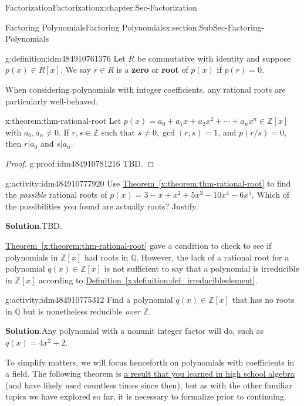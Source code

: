 \documentclass[oneside,10pt,]{book}
\newcommand{\blocktitlefont}{\relax}
\newcommand{\xreffont}{\relax}
\newcommand{\terminology}[1]{\textbf{#1}}
\numberwithin{equation}{section}
\def\Z{{\mathbb Z}}
\def\Q{{\mathbb Q}}
\begin{document}
\begin{chapterptx}{Factorization}{}{Factorization}{}{}{x:chapter:Sec-Factorization}
\begin{sectionptx}{Factoring Polynomials}{}{Factoring Polynomials}{}{}{x:section:SubSec-Factoring-Polynomials}
\begin{definition}{}{g:definition:idm484910761376}
Let \(R\) be commutative with identity and suppose \(p(x) \in R[x]\). We say \(r\in R\) is a \terminology{zero} or \terminology{root} of \(p(x)\) if \(p(r) = 0\).%
\end{definition}
When considering polynomials with integer coefficients, any rational roots are particularly well-behaved.%
\begin{theorem}{}{}{x:theorem:thm-rational-root}%
Let \(p(x) = a_0 + a_1 x + a_2 x^2 + \cdots + a_n x^n \in \Z[x]\) with \(a_0,a_n\ne 0\). If \(r,s\in\Z\) such that \(s\ne 0, \gcd(r,s)=1\), and \(p(r/s)=0\), then \(r|a_0\) and \(s|a_n\).%
\end{theorem}
\begin{proof}{}{g:proof:idm484910781216}
TBD.\end{proof}
\begin{activity}{}{g:activity:idm484910777920}%
Use \hyperref[x:theorem:thm-rational-root]{Theorem~{\xreffont\ref{x:theorem:thm-rational-root}}} to find the \emph{possible} rational roots of \(p(x) = 3 - x + x^2 + 5x^3 - 10x^4 - 6x^5\). Which of the possibilities you found are actually roots? Justify.%
\par\smallskip%
\noindent\textbf{\blocktitlefont Solution}.\hypertarget{g:solution:idm484910775872}{}\quad{}TBD.%
\end{activity}
\hyperref[x:theorem:thm-rational-root]{Theorem~{\xreffont\ref{x:theorem:thm-rational-root}}} gave a condition to check to see if polynomials in \(\Z[x]\) had roots in \(\Q\). However, the lack of a rational root for a polynomial \(q(x)\in \Z[x]\) is not sufficient to say that a polynomial is irreducible in \(\Z[x]\) according to \hyperref[x:definition:def_irreducibleelement]{Definition~{\xreffont\ref{x:definition:def_irreducibleelement}}}.%
\begin{activity}{}{g:activity:idm484910775312}%
Find a polynomial \(q(x) \in \Z[x]\) that has no roots in \(\Q\) but is nonetheless reducible \emph{over \(\Z\)}.%
\par\smallskip%
\noindent\textbf{\blocktitlefont Solution}.\hypertarget{g:solution:idm484910772752}{}\quad{}Any polynomial with a nonunit integer factor will do, such as \(q(x) = 4x^2 + 2\).%
\end{activity}
To simplify matters, we will focus henceforth on polynomials with coefficients in a field. The following theorem is \href{http://www.corestandards.org/Math/Content/HSA/APR/B/2/}{a result that you learned in high school algebra} (and have likely used countless times since then), but as with the other familiar topics we have explored so far, it is necessary to formalize prior to continuing.%

\end{sectionptx}
\end{chapterptx}
\end{document}
